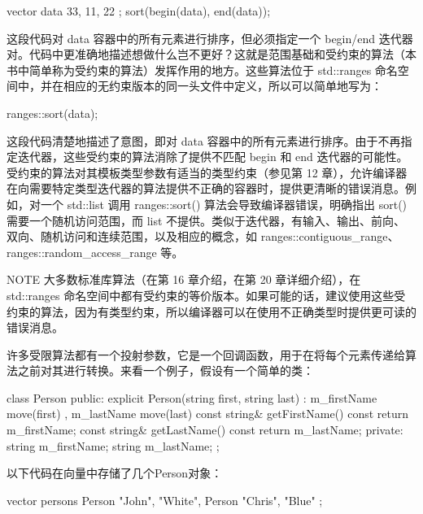 \begin{cpp}
vector data { 33, 11, 22 };
sort(begin(data), end(data));
\end{cpp}

这段代码对 data 容器中的所有元素进行排序，但必须指定一个 begin/end 迭代器对。代码中更准确地描述想做什么岂不更好？这就是范围基础和受约束的算法（本书中简单称为受约束的算法）发挥作用的地方。这些算法位于 std::ranges 命名空间中，并在相应的无约束版本的同一头文件中定义，所以可以简单地写为：

\begin{cpp}
ranges::sort(data);
\end{cpp}

这段代码清楚地描述了意图，即对 data 容器中的所有元素进行排序。由于不再指定迭代器，这些受约束的算法消除了提供不匹配 begin 和 end 迭代器的可能性。受约束的算法对其模板类型参数有适当的类型约束（参见第 12 章），允许编译器在向需要特定类型迭代器的算法提供不正确的容器时，提供更清晰的错误消息。例如，对一个 std::list 调用 ranges::sort() 算法会导致编译器错误，明确指出 sort() 需要一个随机访问范围，而 list 不提供。类似于迭代器，有输入、输出、前向、双向、随机访问和连续范围，以及相应的概念，如 ranges::contiguous\_range、ranges::random\_access\_range 等。

\begin{myNotic}{NOTE}
大多数标准库算法（在第 16 章介绍，在第 20 章详细介绍），在 std::ranges 命名空间中都有受约束的等价版本。如果可能的话，建议使用这些受约束的算法，因为有类型约束，所以编译器可以在使用不正确类型时提供更可读的错误消息。
\end{myNotic}


许多受限算法都有一个投射参数，它是一个回调函数，用于在将每个元素传递给算法之前对其进行转换。来看一个例子，假设有一个简单的类：

\begin{cpp}
class Person
{
    public:
        explicit Person(string first, string last)
            : m_firstName { move(first) }, m_lastName { move(last) } { }
        const string& getFirstName() const { return m_firstName; }
        const string& getLastName() const { return m_lastName; }
    private:
        string m_firstName;
        string m_lastName;
};
\end{cpp}

以下代码在向量中存储了几个Person对象：

\begin{cpp}
vector persons { Person {"John", "White"}, Person {"Chris", "Blue"} };
\end{cpp}

